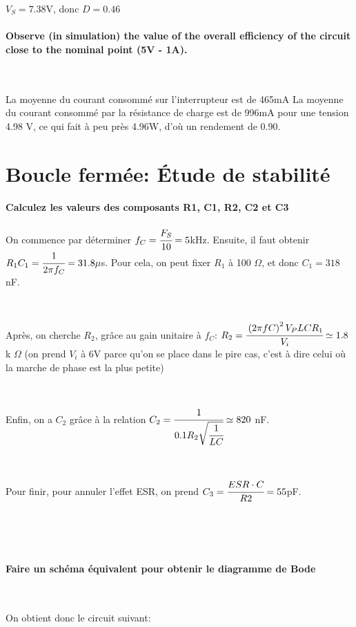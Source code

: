 \documentclass{article}
\begin{document}
$V_S=7.38$V, donc $D=0.46$


\paragraph{Observe (in simulation) the value of the overall efficiency of the circuit close to the nominal point (5V - 1A).}

~

La moyenne du courant consommé sur l’interrupteur est de 465mA
La moyenne du courant consommé par la résistance de charge est de 996mA pour une tension 4.98 V, ce qui fait à peu près 4.96W, d’où un rendement de 0.90.

\section{Boucle fermée: Étude de stabilité}

\paragraph{Calculez les valeurs des composants R1, C1, R2, C2 et C3}
On commence par déterminer $f_C = \cfrac{F_S}{10} = 5$kHz.
Ensuite, il faut obtenir $R_1C_1=\cfrac{1}{2\pi f_C} = 31.8\mu$s.
Pour cela, on peut fixer $R_1$ à 100 $\Omega$, et donc $C_1 = 318$nF.

~

Après, on cherche $R_2$, grâce au gain unitaire à $f_C$: $R_2=\cfrac{\left(2\pi f C\right)^2V_PLCR_1}{V_i} \simeq 1.8 $ k $\Omega$
(on prend $V_i$ à 6V parce qu’on se place dans le pire cas, c’est à dire celui où la marche de phase est la plus petite)

~

Enfin, on a $C_2$ grâce à la relation $C_2=\cfrac{1}{0.1R_2\sqrt{\cfrac{1}{LC}}} \simeq 820$ nF.

~

Pour finir, pour annuler l’effet ESR, on prend $C_3=\cfrac{ESR\cdot C}{R2}=55$pF.

~

~

\newpage

\paragraph{Faire un schéma équivalent pour obtenir le diagramme de Bode}

~

On obtient donc le circuit suivant:
\end{document}
